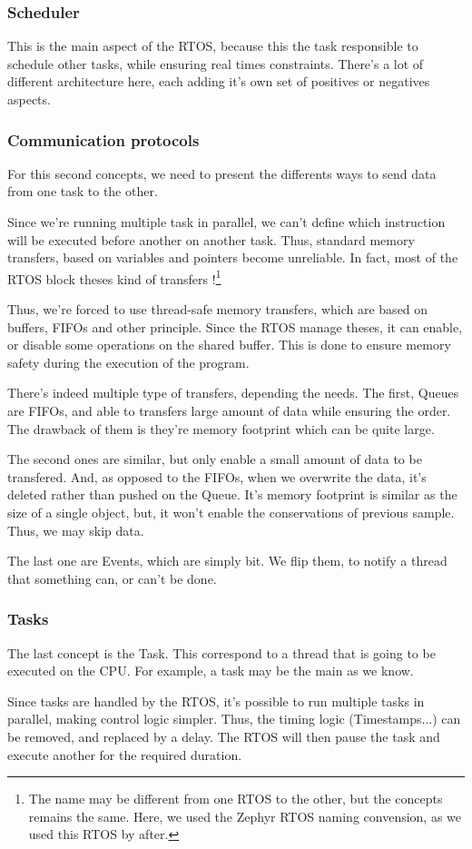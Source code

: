 \subsubsection{Scheduler}
This is the main aspect of the RTOS, because this the task responsible to schedule other tasks, 
while ensuring real times constraints. There's a lot of different architecture here, each adding
it's own set of positives or negatives aspects.

\subsubsection{Communication protocols}
For this second concepts, we need to present the differents ways to send data from one task to the 
other.

Since we're running multiple task in parallel, we can't define which instruction will be executed 
before another on another task. Thus, standard memory transfers, based on variables and pointers 
become unreliable.
In fact, most of the RTOS block theses kind of transfers !\footnote{
    The name may be different from one RTOS to the other, but the concepts remains the same. 
    Here, we used the Zephyr RTOS naming convension, as we used this RTOS by after.
}

Thus, we're forced to use thread-safe memory transfers, which are based on buffers, FIFOs and other
principle. Since the RTOS manage theses, it can enable, or disable some operations on the shared buffer.
This is done to ensure memory safety during the execution of the program.

There's indeed multiple type of transfers, depending the needs.
The first, Queues are FIFOs, and able to transfers large amount of data while ensuring the order. The 
drawback of them is they're memory footprint which can be quite large.

The second ones are similar, but only enable a small amount of data to be transfered. And, as opposed
to the FIFOs, when we overwrite the data, it's deleted rather than pushed on the Queue. It's memory
footprint is similar as the size of a single object, but, it won't enable the conservations of previous
sample. Thus, we may skip data.

The last one are Events, which are simply bit. We flip them, to notify a thread that something can, or
can't be done.

\subsubsection{Tasks}
The last concept is the Task. This correspond to a thread that is going to be executed on the CPU.
For example, a task may be the main as we know.

Since tasks are handled by the RTOS, it's possible to run multiple tasks in parallel, making control 
logic simpler. Thus, the timing logic (Timestamps...) can be removed, and replaced by a delay. The RTOS 
will then pause the task and execute another for the required duration.